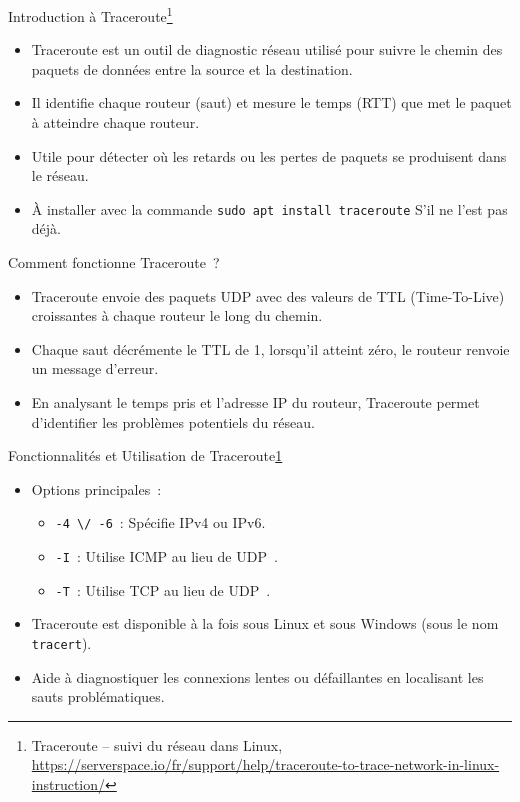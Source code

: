 \documentclass{beamer}
\begin{document}
    \begin{frame}{Introduction à Traceroute\footnote{\label{traceroute}Traceroute – suivi du réseau dans Linux, \url{https://serverspace.io/fr/support/help/traceroute-to-trace-network-in-linux-instruction/}}}
        \begin{itemize}
            \item Traceroute est un outil de diagnostic réseau utilisé pour suivre le chemin des paquets de données entre la source et la destination.
            \item Il identifie chaque routeur (saut) et mesure le temps (RTT) que met le paquet à atteindre chaque routeur.
            \item Utile pour détecter où les retards ou les pertes de paquets se produisent dans le réseau.
            \item À installer avec la commande \lstinline{sudo apt install traceroute} S'il ne l'est pas déjà.
        \end{itemize}
        \bigbreak
        Comment fonctionne Traceroute~?
        \begin{itemize}
            \item Traceroute envoie des paquets UDP avec des valeurs de TTL (Time-To-Live) croissantes à chaque routeur le long du chemin.
            \item Chaque saut décrémente le TTL de 1, lorsqu'il atteint zéro, le routeur renvoie un message d'erreur.
            \item En analysant le temps pris et l'adresse IP du routeur, Traceroute permet d'identifier les problèmes potentiels du réseau.
        \end{itemize}
    \end{frame}

    \begin{frame}{Fonctionnalités et Utilisation de Traceroute\cref{traceroute}}
        \begin{small}
            \begin{itemize}
                \item Options principales~:
                \begin{itemize}
                    \item \lstinline{-4 \/ -6}~: Spécifie IPv4 ou IPv6.
                    \item \lstinline{-I}~: Utilise ICMP au lieu de UDP~.
                    \item \lstinline{-T}~: Utilise TCP au lieu de UDP~.
                \end{itemize}
                \item Traceroute est disponible à la fois sous Linux et sous Windows (sous le nom \lstinline{tracert}).
                \item Aide à diagnostiquer les connexions lentes ou défaillantes en localisant les sauts problématiques.
            \end{itemize}
        \end{small}
    \end{frame}
\end{document}
